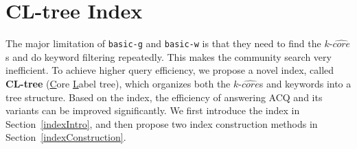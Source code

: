 \section{CL-tree Index}
\label{index}
The major limitation of {\tt basic-g} and {\tt basic-w} is that
they need to find the $k$-$\widehat {core}$s and do keyword filtering repeatedly.
This makes the community search very inefficient.
To achieve higher query efficiency, we propose a novel index,
called \textbf{CL-tree} (\underline{C}ore \underline{L}abel tree),
which organizes both the $k$-$\widehat {core}$s and keywords into a tree structure.
Based on the index, the efficiency of answering ACQ and its variants
can be improved significantly.
We first introduce the index in Section~\ref{indexIntro},
and then propose two index construction methods in Section~\ref{indexConstruction}.




